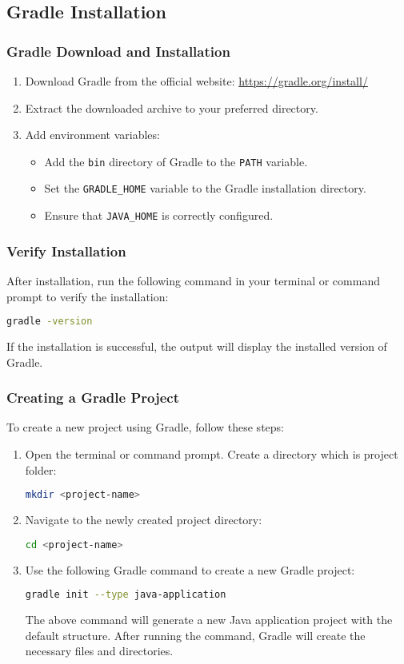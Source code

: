 \documentclass[aspectratio=169, table]{beamer}
\begin{document}
\subsection{Gradle Installation}
\begin{frame}[fragile]
	\frametitle{Gradle Download and Installation}
	\begin{enumerate}
		\item Download Gradle from the official website: \url{https://gradle.org/install/}
		\item Extract the downloaded archive to your preferred directory.
		\item Add environment variables:
		\begin{itemize}
			\item Add the \texttt{bin} directory of Gradle to the \texttt{PATH} variable.
			\item Set the \texttt{GRADLE\_HOME} variable to the Gradle installation directory.
			\item Ensure that \texttt{JAVA\_HOME} is correctly configured.
		\end{itemize}
	\end{enumerate}
\end{frame}


\begin{frame}[fragile]
	\frametitle{Verify Installation}
	After installation, run the following command in your terminal or command prompt to verify the installation:
	\begin{lstlisting}[language=bash]
		gradle -version
	\end{lstlisting}
	If the installation is successful, the output will display the installed version of Gradle.
\end{frame}

\begin{frame}[fragile]
	\vspace{20pt}
	\frametitle{Creating a Gradle Project}
	To create a new project using Gradle, follow these steps:
	\begin{enumerate}
		\item Open the terminal or command prompt. Create a directory which is project folder:
		\begin{lstlisting}[language=bash]
			mkdir <project-name>
		\end{lstlisting}
		\item Navigate to the newly created project directory:
		\begin{lstlisting}[language=bash]
			cd <project-name>
		\end{lstlisting}
		\item Use the following Gradle command to create a new Gradle project:
		\begin{lstlisting}[language=bash]
			gradle init --type java-application
		\end{lstlisting}
		The above command will generate a new Java application project with the default structure. After running the command, Gradle will create the necessary files and directories.
		
	\end{enumerate}
\end{frame}
\end{document}
